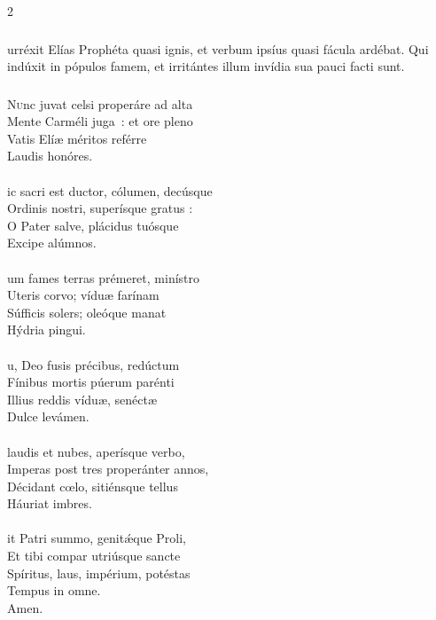 \documentclass[9pt,twoside]{extarticle}
\begin{document}
\begin{multicols}{2}
{{\subsubsection*{}
urréxit Elías Prophéta quasi ignis, et verbum ipsíus quasi fácula ardébat. Qui indúxit in pópulos famem, et irritántes illum invídia sua pauci facti sunt.

\subsubsection*{\center {}}
\lettrine{N}unc juvat celsi properáre ad alta\\
Mente Carméli juga~: et ore pleno\\
Vatis Elíæ méritos reférre\\
Laudis honóres.\\
\\
ic sacri est ductor, cólumen, decúsque\\
Ordinis nostri, superísque gratus :\\
O Pater salve, plácidus tuósque\\
Excipe alúmnos.\\
\\
um fames terras prémeret, minístro\\
Uteris corvo; víduæ farínam\\
Súfficis solers; oleóque manat\\
Hýdria pingui.\\
\\
u, Deo fusis précibus, redúctum\\
Fínibus mortis púerum parénti\\
Illius reddis víduæ, senéctæ\\
Dulce levámen.\\
\\
laudis et nubes, aperísque verbo,\\
Imperas post tres properánter annos,\\
Décidant cœlo, sitiénsque tellus\\
Háuriat imbres.\\
\\
it Patri summo, genitǽque Proli,\\
Et tibi compar utriúsque sancte\\
Spíritus, laus, impérium, potéstas\\
Tempus in omne.\\
Amen.

}}
\end{multicols}
\end{document}

